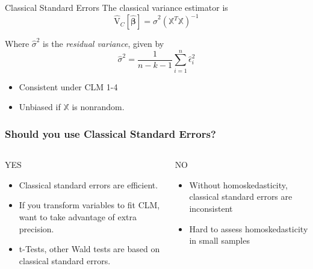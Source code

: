 \documentclass[12pt, block=fill]{beamer}
\newcommand{\V}{\text{V}}
\newcommand{\X}{\mathbb{X}}
\begin{document}
\begin{frame}
  \begin{block}{Classical Standard Errors}
The classical variance estimator is 
  $$ \widehat{\V}_C[ \boldsymbol{ \hat \beta} ]  =  \hat \sigma^2 (   \X^T\X) ^{-1}$$
  
 Where $\hat \sigma^2$ is the \textit{residual variance}, given by
 $$\hat \sigma^2 = \frac{1}{n-k-1} \sum_{i=1}^n \hat \epsilon_i^2$$
    \end{block}

\begin{itemize}
\item Consistent under CLM 1-4
\item Unbiased if $\X$ is nonrandom.
\end{itemize}

\end{frame}



\begin{frame}
  \frametitle{Should you use Classical Standard Errors?}
  
  \begin{columns}[t]
\begin{column}{0.5\textwidth}
YES
\begin{itemize}
\item Classical standard errors are efficient.
\item If you transform variables to fit CLM, want to take advantage of extra precision.
\item t-Tests, other Wald tests are based on classical standard errors.
\end{itemize}

\end{column}
\begin{column}{0.5\textwidth}
NO
\begin{itemize}
\item Without homoskedasticity, classical standard errors are inconsistent
\item Hard to assess homoskedasticity in small samples
\end{itemize}


\end{column}
\end{columns}
\end{frame}
\end{document}
